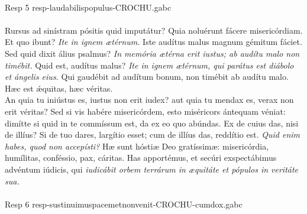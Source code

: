 \documentclass[options]{article}
\begin{document}
 \\
 Resp 5   resp-laudabilispopulus-CROCHU.gabc\\
 \\
   Rursus ad sinístram pósitis quid imputátur? Quia noluérunt fácere misericórdiam. Et quo ibunt? \emph{Ite in ignem ætérnum.} Iste audítus malus magnum gémitum fáciet. Sed quid dixit álius psalmus? \emph{In memória ætérna erit iustus; ab audítu malo non timébit.} Quid est, audítus malus? \emph{Ite in ignem ætérnum, qui parátus est diábolo et ángelis eius.} Qui gaudébit ad audítum bonum, non timébit ab audítu malo. Hæc est \'{æ}quitas, hæc véritas.\\ 
 An quia tu iniústus es, iustus non erit iudex? aut quia tu mendax es, verax non erit véritas? Sed si vis habére misericórdem, esto miséricors ántequam véniat: dimítte si quid in te commíssum est, da ex eo quo abúndas. Ex de cuius das, nisi de illíus? Si de tuo dares, largítio esset; cum de illíus das, reddítio est. \emph{ Quid enim habes, quod non accepísti?} Hæ sunt hóstiæ Deo gratíssimæ: misericórdia, humílitas, conféssio, pax, cáritas. Has apportémus, et secúri exspectábimus advéntum iúdicis, qui \emph{iudicábit orbem terrárum in æquitáte et pópulos in veritáte sua.}\\
 \\
 Resp 6    resp-sustinuimuspacemetnonvenit-CROCHU-cumdox.gabc\\
\end{document}
